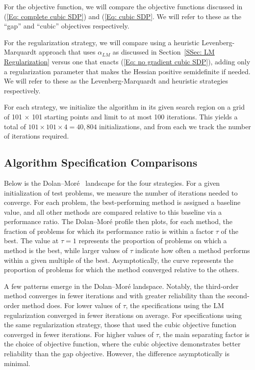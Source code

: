 \documentclass[11pt]{article}
\theoremstyle{plain}
\theoremstyle{definition}
\theoremstyle{remark}
\begin{document}
For the objective function, we will compare the objective functions discussed in (\ref{Eq: complete cubic SDP}) and (\ref{Eq: cubic SDP}. We will refer to these as the ``gap'' and ``cubic'' objectives respectively.

For the regularization strategy, we will compare using a heuristic Levenberg-Marquardt approach that uses $\alpha_{LM}$ as discussed in Section~\ref{SSec: LM Regularization} versus one that enacts (\ref{Eq: no gradient cubic SDP}), adding only a regularization parameter that makes the Hessian positive semidefinite if needed. We will refer to these as the Levenberg-Marquardt and heuristic strategies respectively.

For each strategy, we initialize the algorithm in its given search region on a grid of 101 $\times$ 101 starting points and limit to at most 100 iterations. This yields a total of $101 \times 101 \times 4 = 40,804$ initializations, and from each we track the number of iterations required.

\subsection{Algorithm Specification Comparisons}\label{SSec: Comparisons}

Below is the Dolan–Moré~\cite{dolan2002benchmarking} landscape for the four strategies. For a given initialization of test problems, we measure the number of iterations needed to converge. For each problem, the best-performing method is assigned a baseline value, and all other methods are compared relative to this baseline via a performance ratio. The Dolan–Moré profile then plots, for each method, the fraction of problems for which its performance ratio is within a factor $\tau$ of the best. The value at $\tau = 1$ represents the proportion of problems on which a method is the best, while larger values of $\tau$ indicate how often a method performs within a given multiple of the best. Asymptotically, the curve represents the proportion of problems for which the method converged relative to the others.

A few patterns emerge in the Dolan–Moré landspace. Notably, the third-order method converges in fewer iterations and with greater reliability than the second-order method does. For lower values of $\tau$, the specifications using the LM regularization converged in fewer iterations on average. For specifications using the same regularization strategy, those that used the cubic objective function converged in fewer iterations. For higher values of $\tau$, the main separating factor is the choice of objective function, where the cubic objective demonstrates better reliability than the gap objective. However, the difference asymptotically is minimal.
\end{document}
